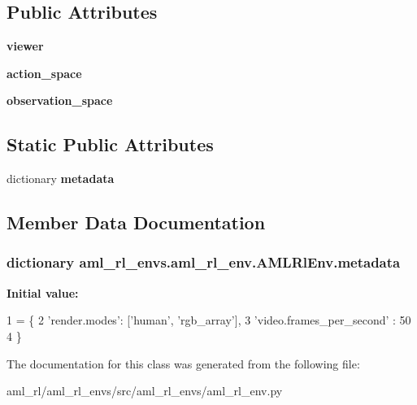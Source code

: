 \subsection*{Public Attributes}
\begin{DoxyCompactItemize}
\item 
\hypertarget{classaml__rl__envs_1_1aml__rl__env_1_1_a_m_l_rl_env_a348e95b89f7267fdc98b6af10e7afb63}{{\bfseries viewer}}\label{classaml__rl__envs_1_1aml__rl__env_1_1_a_m_l_rl_env_a348e95b89f7267fdc98b6af10e7afb63}

\item 
\hypertarget{classaml__rl__envs_1_1aml__rl__env_1_1_a_m_l_rl_env_a2e965affb3c1441783a6eeba044b2706}{{\bfseries action\-\_\-space}}\label{classaml__rl__envs_1_1aml__rl__env_1_1_a_m_l_rl_env_a2e965affb3c1441783a6eeba044b2706}

\item 
\hypertarget{classaml__rl__envs_1_1aml__rl__env_1_1_a_m_l_rl_env_ab01410312e4a45bf7d3d2a5e264d4c91}{{\bfseries observation\-\_\-space}}\label{classaml__rl__envs_1_1aml__rl__env_1_1_a_m_l_rl_env_ab01410312e4a45bf7d3d2a5e264d4c91}

\end{DoxyCompactItemize}
\subsection*{Static Public Attributes}
\begin{DoxyCompactItemize}
\item 
dictionary {\bfseries metadata}
\end{DoxyCompactItemize}


\subsection{Member Data Documentation}
\hypertarget{classaml__rl__envs_1_1aml__rl__env_1_1_a_m_l_rl_env_af1f198690f894e418339ce8457f0d1ba}{
\subsubsection[{metadata}]{\setlength{\rightskip}{0pt plus 5cm}dictionary aml\-\_\-rl\-\_\-envs.\-aml\-\_\-rl\-\_\-env.\-A\-M\-L\-Rl\-Env.\-metadata\hspace{0.3cm}{\ttfamily [static]}}}\label{classaml__rl__envs_1_1aml__rl__env_1_1_a_m_l_rl_env_af1f198690f894e418339ce8457f0d1ba}
{\bfseries Initial value\-:}
\begin{DoxyCode}
1 = \{
2       \textcolor{stringliteral}{'render.modes'}: [\textcolor{stringliteral}{'human'}, \textcolor{stringliteral}{'rgb\_array'}],
3       \textcolor{stringliteral}{'video.frames\_per\_second'} : 50
4     \}
\end{DoxyCode}


The documentation for this class was generated from the following file\-:\begin{DoxyCompactItemize}
\item 
aml\-\_\-rl/aml\-\_\-rl\-\_\-envs/src/aml\-\_\-rl\-\_\-envs/aml\-\_\-rl\-\_\-env.\-py\end{DoxyCompactItemize}
